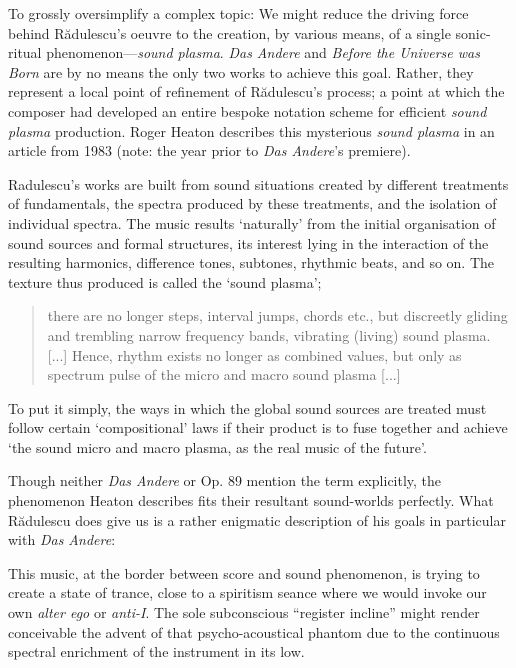     To grossly oversimplify a complex topic: We might reduce the driving force behind R\u{a}dulescu's oeuvre to the creation, by various means, of a single sonic-ritual phenomenon---\textit{sound plasma}. \textit{Das Andere} and \textit{Before the Universe was Born} are by no means the only two works to achieve this goal. Rather, they represent a local point of refinement of R\u{a}dulescu's process; a point at which the composer had developed an entire bespoke notation scheme for efficient \textit{sound plasma} production. Roger Heaton describes this mysterious \textit{sound plasma} in an article from 1983 (note: the year prior to \textit{Das Andere}'s premiere).

        \begin{smallquote}
            Radulescu's works are built from sound situations created by different treatments of fundamentals, the spectra produced by these treatments, and the isolation of individual spectra. The music results `naturally' from the initial organisation of sound sources and formal structures, its interest lying in the interaction of the resulting harmonics, difference tones, subtones, rhythmic beats, and so on. The texture thus produced is called the `sound plasma';
            \begin{quote}
                there are no longer steps, interval jumps, chords etc., but discreetly gliding and trembling narrow frequency bands, vibrating (living) sound plasma. [...] Hence, rhythm exists no longer as combined values, but only as spectrum pulse of the micro and macro sound plasma [...]\autocite{Radulescu_1975}
            \end{quote}
            To put it simply, the ways in which the global sound sources are treated must follow certain `compositional' laws if their product is to fuse together and achieve `the sound micro and macro plasma, as the real music of the future'.\autocite[23-4]{Heaton_1983}
        \end{smallquote}

    Though neither \textit{Das Andere} or Op. 89 mention the term explicitly, the phenomenon Heaton describes fits their resultant sound-worlds perfectly. What R\u{a}dulescu does give us is a rather enigmatic description of his goals in particular with \textit{Das Andere}:

        \begin{smallquote}
            This music, at the border between score and sound phenomenon, is trying to create a state of trance, close to a spiritism seance where we would invoke our own \textit{alter ego} or \textit{anti-I}. The sole subconscious ``register incline'' might render conceivable the advent of that psycho-acoustical phantom due to the continuous spectral enrichment of the instrument in its low. \autocite[dedication page]{Radulescu_1984}
        \end{smallquote}

